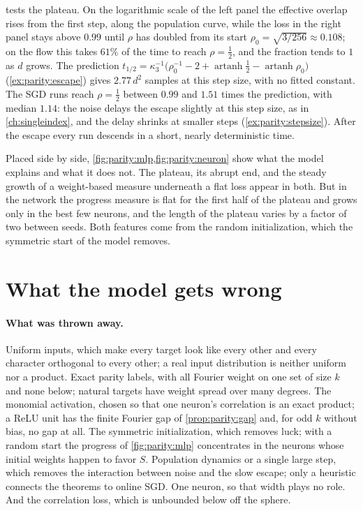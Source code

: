 \begin{refsection}
 tests the plateau. On the logarithmic scale of the left panel the effective overlap rises from the first step, along the population curve, while the loss in the right panel stays above $0.99$ until $\rho$ has doubled from its start $\rho_0=\sqrt{3/256}\approx0.108$; on the flow this takes $61\%$ of the time to reach $\rho=\frac12$, and the fraction tends to $1$ as $d$ grows. The prediction $t_{1/2}=\kappa_3^{-1}\bigl(\rho_0^{-1}-2+\operatorname{artanh}\frac12-\operatorname{artanh}\rho_0\bigr)$ (\cref{ex:parity:escape}) gives $2.77\,d^2$ samples at this step size, with no fitted constant. The SGD runs reach $\rho=\frac12$ between $0.99$ and $1.51$ times the prediction, with median $1.14$: the noise delays the escape slightly at this step size, as in \cref{ch:singleindex}, and the delay shrinks at smaller steps (\cref{ex:parity:stepsize}). After the escape every run descends in a short, nearly deterministic time.

Placed side by side, \cref{fig:parity:mlp,fig:parity:neuron} show what the model explains and what it does not. The plateau, its abrupt end, and the steady growth of a weight-based measure underneath a flat loss appear in both. But in the network the progress measure is flat for the first half of the plateau and grows only in the best few neurons, and the length of the plateau varies by a factor of two between seeds. Both features come from the random initialization, which the symmetric start of the model removes.

\section{What the model gets wrong}\label{sec:parity:wrong}

\paragraph{What was thrown away.}
Uniform inputs, which make every target look like every other and every character orthogonal to every other; a real input distribution is neither uniform nor a product. Exact parity labels, with all Fourier weight on one set of size $k$ and none below; natural targets have weight spread over many degrees. The monomial activation, chosen so that one neuron's correlation is an exact product; a ReLU unit has the finite Fourier gap of \cref{prop:parity:gap} and, for odd $k$ without bias, no gap at all. The symmetric initialization, which removes luck; with a random start the progress of \cref{fig:parity:mlp} concentrates in the neurons whose initial weights happen to favor $S$. Population dynamics or a single large step, which removes the interaction between noise and the slow escape; only a heuristic connects the theorems to online SGD. One neuron, so that width plays no role. And the correlation loss, which is unbounded below off the sphere.


\end{refsection}
